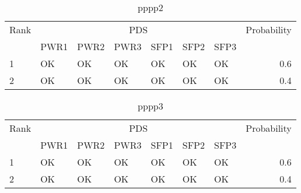 \begin{table}
  \centering
  \begin{tabular}{lllllllr}
    \hline
    Rank & \multicolumn{6}{c}{PDS} & Probability           \\
    \cline{2-7}
         & PWR1 & PWR2 & PWR3 & SFP1 & SFP2 & SFP3 &       \\
    \hline \hline
     1   & OK   & OK   & OK   & OK   & OK   & OK   & 0.6   \\
     2   & OK   & OK   & OK   & OK   & OK   & OK   & 0.4   \\
    \hline
  \end{tabular}
  \caption{pppp2}
  \label{tab:results2}
\end{table}

\begin{table}
  \centering
  \begin{tabular}{lllllllr}
    \hline
    Rank & \multicolumn{6}{c}{PDS} & Probability           \\
    \cline{2-7}
         & PWR1 & PWR2 & PWR3 & SFP1 & SFP2 & SFP3 &       \\
    \hline \hline
     1   & OK   & OK   & OK   & OK   & OK   & OK   & 0.6   \\
     2   & OK   & OK   & OK   & OK   & OK   & OK   & 0.4   \\
    \hline
  \end{tabular}
  \caption{pppp3}
  \label{tab:results3}
\end{table}
